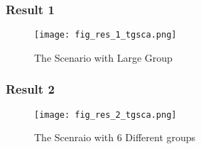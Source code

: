 \begin{frame}
    \frametitle{Result 1}
    \begin{figure}
        \texttt{[image: fig\_res\_1\_tgsca.png]}
        \caption{The Scenario with Large Group}
    \end{figure}
\end{frame}

\begin{frame}
    \frametitle{Result 2}
    \begin{figure}
        \texttt{[image: fig\_res\_2\_tgsca.png]}
        \caption{The Scenraio with 6 Different groups}
    \end{figure}
\end{frame}